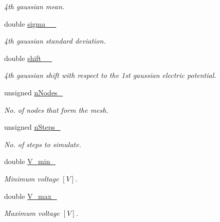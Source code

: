 \begin{DoxyCompactItemize}
\begin{DoxyCompactList}\small\item\em 4th gaussian mean. \end{DoxyCompactList}\item 
\hypertarget{classParamList_a8c6b6653287d435a1dce5f3ce3819352}{double \hyperlink{classParamList_a8c6b6653287d435a1dce5f3ce3819352}{sigma\-\_\-\_\-}}\label{classParamList_a8c6b6653287d435a1dce5f3ce3819352}

\begin{DoxyCompactList}\small\item\em 4th gaussian standard deviation. \end{DoxyCompactList}\item 
\hypertarget{classParamList_a966625893d78fcd3c8e989792b500617}{double \hyperlink{classParamList_a966625893d78fcd3c8e989792b500617}{shift\-\_\-\_\-}}\label{classParamList_a966625893d78fcd3c8e989792b500617}

\begin{DoxyCompactList}\small\item\em 4th gaussian shift with respect to the 1st gaussian electric potential. \end{DoxyCompactList}\item 
\hypertarget{classParamList_a8f4bb43717322579edc12974700aec98}{unsigned \hyperlink{classParamList_a8f4bb43717322579edc12974700aec98}{n\-Nodes\-\_\-}}\label{classParamList_a8f4bb43717322579edc12974700aec98}

\begin{DoxyCompactList}\small\item\em No. of nodes that form the mesh. \end{DoxyCompactList}\item 
\hypertarget{classParamList_af3118b388e4eb4a7ae9831c7aa947f84}{unsigned \hyperlink{classParamList_af3118b388e4eb4a7ae9831c7aa947f84}{n\-Steps\-\_\-}}\label{classParamList_af3118b388e4eb4a7ae9831c7aa947f84}

\begin{DoxyCompactList}\small\item\em No. of steps to simulate. \end{DoxyCompactList}\item 
\hypertarget{classParamList_ac4ae07e3255e2b3f4049da61d0b582ad}{double \hyperlink{classParamList_ac4ae07e3255e2b3f4049da61d0b582ad}{V\-\_\-min\-\_\-}}\label{classParamList_ac4ae07e3255e2b3f4049da61d0b582ad}

\begin{DoxyCompactList}\small\item\em Minimum voltage $ \left[ V \right] $. \end{DoxyCompactList}\item 
\hypertarget{classParamList_adfe385de93c027c018dbb12b622e9d26}{double \hyperlink{classParamList_adfe385de93c027c018dbb12b622e9d26}{V\-\_\-max\-\_\-}}\label{classParamList_adfe385de93c027c018dbb12b622e9d26}

\begin{DoxyCompactList}\small\item\em Maximum voltage $ \left[ V \right] $. \end{DoxyCompactList}\end{DoxyCompactItemize}
